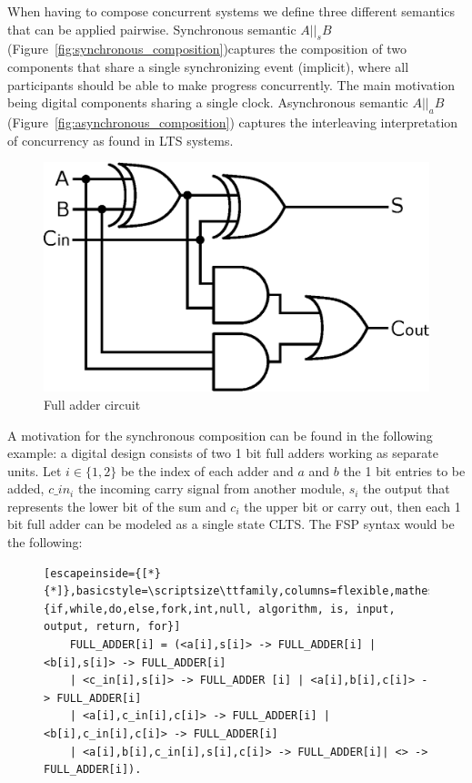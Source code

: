 
When having to compose concurrent systems we define three different semantics that can be applied pairwise. Synchronous semantic $A ||_s B$ (Figure~\ref{fig:synchronous_composition})captures the composition of two components that share a single synchronizing event (implicit), where all participants should be able to make progress concurrently. The main motivation being digital components sharing a single clock. 
Asynchronous semantic $A ||_a B$ (Figure~\ref{fig:asynchronous_composition}) captures the interleaving interpretation of concurrency as found in LTS systems. 

\begin{figure}[h]
		\centering
	\includegraphics[scale=.4]{img/full-adder.eps}
	\caption{Full adder circuit}
	\label{fig:full_adder_circuit}
\end{figure}

A motivation for the synchronous composition can be found in the following example: a digital design consists of two 1 bit full adders working as separate units. Let $i \in \{1,2\}$ be the index of each adder and $a$ and $b$ the 1 bit entries to be added, $c\_in_i$ the incoming carry signal from another module, $s_i$ the output that represents the lower bit of the sum and $c_i$ the upper bit or carry out, then each 1 bit full adder can be modeled as a single state CLTS.  The FSP syntax would be the following:

\renewcommand{\ttdefault}{pcr}
\begin{figure}[H]
	\begin{lstlisting}[escapeinside={[*}{*]},basicstyle=\scriptsize\ttfamily,columns=flexible,mathescape=true,xleftmargin=3.0ex,keywordstyle=\textbf,morekeywords={if,while,do,else,fork,int,null, algorithm, is, input, output, return, for}]
	FULL_ADDER[i] = (<a[i],s[i]> -> FULL_ADDER[i] | <b[i],s[i]> -> FULL_ADDER[i] 
	| <c_in[i],s[i]> -> FULL_ADDER [i] | <a[i],b[i],c[i]> -> FULL_ADDER[i]
	| <a[i],c_in[i],c[i]> -> FULL_ADDER[i] | <b[i],c_in[i],c[i]> -> FULL_ADDER[i]
	| <a[i],b[i],c_in[i],s[i],c[i]> -> FULL_ADDER[i]| <> -> FULL_ADDER[i]).
\end{lstlisting}
\label{fig:full_adder_fsp}
\MediumPicture
\end{figure}	

